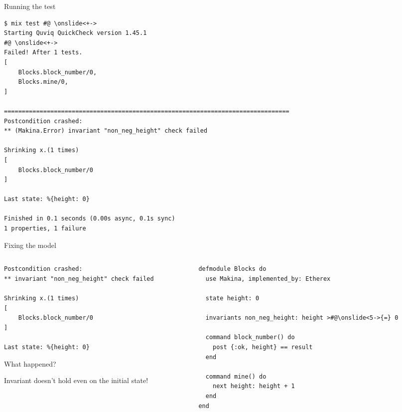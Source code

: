 \documentclass[aspectratio=169, 10pt]{beamer}
\begin{document}
\begin{frame}[label={sec:orgc795ad5},fragile]{Running the test}
 \onslide<+->
\onslide<+->
\lstset{language=bash,label= ,caption= ,captionpos=b,numbers=none,style=shell}
\begin{lstlisting}
$ mix test #@ \onslide<+->
Starting Quviq QuickCheck version 1.45.1
#@ \onslide<+->
Failed! After 1 tests.
[
    Blocks.block_number/0,
    Blocks.mine/0,
]

================================================================================
Postcondition crashed:
** (Makina.Error) invariant "non_neg_height" check failed

Shrinking x.(1 times)
[
    Blocks.block_number/0
]

Last state: %{height: 0}

Finished in 0.1 seconds (0.00s async, 0.1s sync)
1 properties, 1 failure
\end{lstlisting}
\end{frame}

\begin{frame}[label={sec:org0f34697},fragile]{Fixing the model}
 \begin{columns}
\begin{column}{0.48\columnwidth}
\onslide<+->
\onslide<+->
\lstset{language=bash,label= ,caption= ,captionpos=b,numbers=none,style=shell}
\begin{lstlisting}
Postcondition crashed:
** invariant "non_neg_height" check failed

Shrinking x.(1 times)
[
    Blocks.block_number/0
]

Last state: %{height: 0}
\end{lstlisting}

\onslide<+->
What happened?

\vspace{10pt}
\onslide<+->
Invariant doesn't hold even on the initial state!
\end{column}

\begin{column}{0.48\columnwidth}
\lstset{language=elixir,label= ,caption= ,captionpos=b,numbers=none,style=display}
\begin{lstlisting}
defmodule Blocks do
  use Makina, implemented_by: Etherex

  state height: 0

  invariants non_neg_height: height >#@\onslide<5->{=} 0

  command block_number() do
    post {:ok, height} == result
  end

  command mine() do
    next height: height + 1
  end
end
\end{lstlisting}
\end{column}
\end{columns}
\end{frame}
\end{document}
